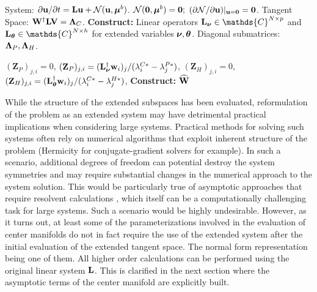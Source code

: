 \begin{algorithm}
	\caption{Extended tangent space ($\ExtL^{\dagger}$)}\label{algo:extended_adjoint_tangent}
	\begin{algorithmic}[0]
		\Require System: $\partial \mathbf{u}/\partial t = \mathbf{L} \mathbf{u} + \mathcal{N}(\mathbf{u},\boldsymbol{\mu}^{b})$.
		\Ensure $\mathcal{N}(\mathbf{0},\boldsymbol{\mu}^{b}) = \mathbf{0};$ $(\partial\mathcal{N}/\partial \mathbf{u})|_{\mathbf{u}=\mathbf{0}} = \mathbf{0}$. 
		\Require Tangent Space: $\mathbf{W}^{\dagger}\mathbf{L} \mathbf{V} = \mathbf{\Lambda}_{C}$.
		\State \textbf{Construct:} Linear operators $\Lnu\in\mathds{C}^{N\times p}$ and $\Ltheta\in\mathds{C}^{N\times h}$ for extended variables $\boldsymbol{\nu},\boldsymbol{\theta}$. 
		\Require Diagonal submatrices: $\mathbf{\Lambda}_{P},\mathbf{\Lambda}_{H}$.
		
		\State {}
					\State $(\mathbf{Z}_{P})_{j,i} = 0$,
				\Else
					\State $(\mathbf{Z}_{P})_{j,i} =
				(\mathbf{L}_{\boldsymbol{\nu}}^{\dagger}\mathbf{w}_{i})_{j}/(\lambda^{C*}_{i} - \lambda^{P*}_{j})$,
				\EndIf
			\EndFor
					\State $(\mathbf{Z}_{H})_{j,i} = 0$,
				\Else
					\State $(\mathbf{Z}_{H})_{j,i} =
						(\mathbf{L}_{\boldsymbol{\theta}}^{\dagger}\mathbf{w}_{i})_{j}/(\lambda^{C*}_{i} - \lambda^{H*}_{j})$,
				\EndIf
			\EndFor
		\EndFor
		\State \textbf{Construct:} $\widehat{\mathbf{W}}$ 
		\State {}
	\end{algorithmic}
\end{algorithm}

While the structure of the extended subspaces has been evaluated, reformulation of the problem as an extended system may have detrimental practical implications when considering large systems. Practical methods for solving such systems often rely on numerical algorithms that exploit inherent structure of the problem (Hermicity for conjugate-gradient solvers for example). In such a scenario, additional degrees of freedom can potential destroy the system symmetries and may require substantial changes in the numerical approach to the system solution. This would be particularly true of asymptotic approaches that require resolvent calculations \citep{coullet83,cabre05,sipp07,haragus11,carini15,gallaire16,haro16,jain22,negi24}, which itself can be a computationally challenging task for large systems. Such a scenario would be highly undesirable. However, as it turns out, at least some of the parameterizations involved in the evaluation of center manifolds do not in fact require the use of the extended system after the initial evaluation of the extended tangent space. The normal form representation being one of them. All higher order calculations can be performed using the original linear system $\mathbf{L}$. This is clarified in the next section where the asymptotic terms of the center manifold are explicitly built. 



